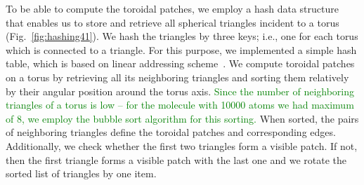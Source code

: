 


To be able to compute the toroidal patches, we employ a hash data structure that enables us to store and retrieve all spherical triangles incident to a torus (Fig.~\ref{fig:hashing41}). 
We hash the triangles by three keys; i.e., one for each torus which is connected to a triangle.
For this purpose, we implemented a simple hash table, which is based on linear addressing scheme~\cite{alcantara2011efficient}.
We compute toroidal patches on a torus by retrieving all its neighboring triangles and sorting them relatively by their angular position around the torus axis.
\textcolor{green}{
Since the number of neighboring triangles of a torus is low -- for the molecule with {\tweakedsim}10000 atoms we had maximum of 8, we employ the bubble sort algorithm for this sorting.
}
When sorted, the pairs of neighboring triangles define the toroidal patches and corresponding edges.
Additionally, we check whether the first two triangles form a visible patch.
If not, then the first triangle forms a visible patch with the last one and we rotate the sorted list of triangles by one item.

